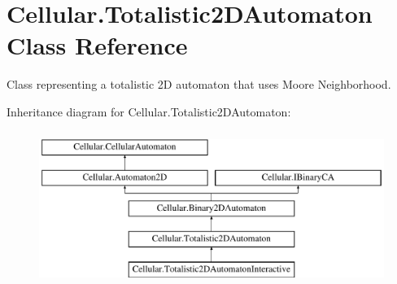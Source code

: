 \hypertarget{class_cellular_1_1_totalistic2_d_automaton}{}\section{Cellular.\+Totalistic2\+D\+Automaton Class Reference}
\label{class_cellular_1_1_totalistic2_d_automaton}


Class representing a totalistic 2\+D automaton that uses Moore Neighborhood.  


Inheritance diagram for Cellular.\+Totalistic2\+D\+Automaton\+:\begin{figure}[H]
\begin{center}
\leavevmode
\includegraphics[height=5.000000cm]{class_cellular_1_1_totalistic2_d_automaton}
\end{center}
\end{figure}
